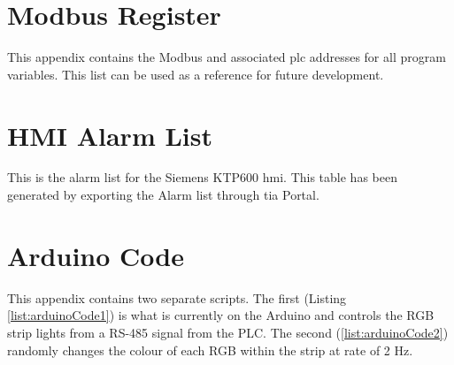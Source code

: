 \chapter{Modbus Register} \label{app:modbusRegister}
    This appendix contains the Modbus and associated \acrshort{plc} addresses for all program variables. This list can be used as a reference for future development.
    

\chapter{HMI Alarm List} \label{app:alarmList}
    This is the alarm list for the Siemens KTP600 \acrshort{hmi}. This table has been generated by exporting the Alarm list through \acrshort{tia} Portal. 
    

\chapter{Arduino Code} \label{app:arduino}
    This appendix contains two separate scripts. The first (Listing \ref{list:arduinoCode1}) is what is currently on the Arduino and controls the RGB strip lights from a RS-485 signal from the PLC. The second (\ref{list:arduinoCode2}) randomly changes the colour of each RGB within the strip at rate of 2 Hz. 
    

    


